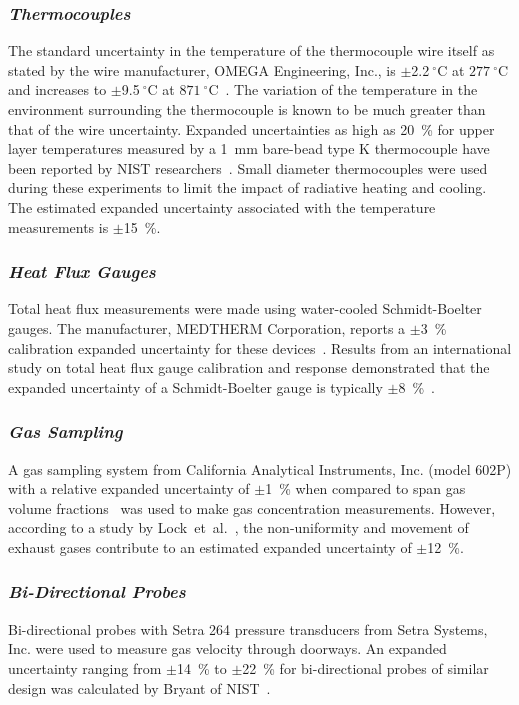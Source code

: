 \subsubsection*{\textit{Thermocouples}}
The standard uncertainty in the temperature of the thermocouple wire itself as stated by the wire manufacturer, OMEGA Engineering, Inc., is $\pm$2.2$~^{\circ}$C at $277~^{\circ}$C and increases to $\pm$9.5$~^{\circ}$C at $871~^{\circ}$C~\cite{Omega:2004}. The variation of the temperature in the environment surrounding the thermocouple is known to be much greater than that of the wire uncertainty. Expanded uncertainties as high as 20~\% for upper layer temperatures measured by a 1~mm bare-bead type K thermocouple have been reported by NIST researchers~\cite{Blevins:1999,Pitts:2003}. Small diameter thermocouples were used during these experiments to limit the impact of radiative heating and cooling. The estimated expanded uncertainty associated with the temperature measurements is $\pm$15~\%.

\subsubsection*{\textit{Heat Flux Gauges}}
Total heat flux measurements were made using water-cooled Schmidt-Boelter gauges. The manufacturer, MEDTHERM Corporation, reports a $\pm$3~\% calibration expanded uncertainty for these devices~\cite{Medtherm:2003}. Results from an international study on total heat flux gauge calibration and response demonstrated that the expanded uncertainty of a Schmidt-Boelter gauge is typically $\pm$8~\%~\cite{Pitts:2006}.

\subsubsection*{\textit{Gas Sampling}}
A gas sampling system from California Analytical Instruments, Inc. (model 602P) with a relative expanded uncertainty of $\pm$1~\% when compared to span gas volume fractions~\cite{Bundy:2007} was used to make gas concentration measurements. However, according to a study by Lock~et~al.~\cite{Lock:1}, the non-uniformity and movement of exhaust gases contribute to an estimated expanded uncertainty of $\pm$12~\%.

\subsubsection*{\textit{Bi-Directional Probes}}
Bi-directional probes with Setra 264 pressure transducers from Setra Systems, Inc. were used to measure gas velocity through doorways. An expanded uncertainty ranging from $\pm$14~\% to $\pm$22~\% for bi-directional probes of similar design was calculated by Bryant of NIST~\cite{Bryant:FSJ2009}.

